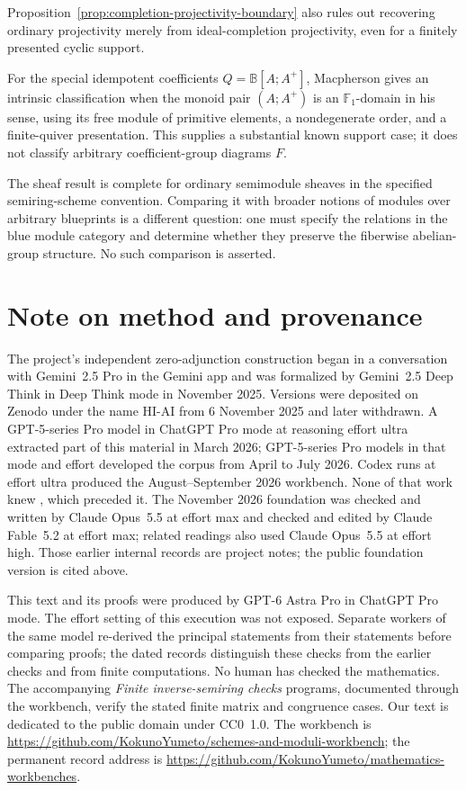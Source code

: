 \documentclass[11pt]{amsart}
\newcommand{\workbenchurl}{https://github.com/KokunoYumeto/schemes-and-moduli-workbench}
\newcommand{\recordurl}{https://github.com/KokunoYumeto/mathematics-workbenches}
\newcommand{\B}{\mathbb B}
\theoremstyle{definition}
\theoremstyle{remark}
\begin{document}
Proposition~\ref{prop:completion-projectivity-boundary} also rules out recovering ordinary projectivity merely from ideal-completion projectivity, even for a finitely presented cyclic support.

For the special idempotent coefficients $Q=\B[A;A^+]$, Macpherson \cite[Definition~4.9 and Corollary~4.13, pp.~14--16]{Macpherson} gives an intrinsic classification when the monoid pair $(A;A^+)$ is an $\mathbb F_1$-domain in his sense, using its free module of primitive elements, a nondegenerate order, and a finite-quiver presentation. This supplies a substantial known support case; it does not classify arbitrary coefficient-group diagrams $F$.

The sheaf result is complete for ordinary semimodule sheaves in the specified semiring-scheme convention. Comparing it with broader notions of modules over arbitrary blueprints is a different question: one must specify the relations in the blue module category and determine whether they preserve the fiberwise abelian-group structure. No such comparison is asserted.



\section*{Note on method and provenance}
The project's independent zero-adjunction construction began in a conversation with Gemini~2.5 Pro in the Gemini app and was formalized by Gemini~2.5 Deep Think in Deep Think mode in November 2025. Versions were deposited on Zenodo under the name HI-AI from 6 November 2025 and later withdrawn. A GPT-5-series Pro model in ChatGPT Pro mode at reasoning effort ultra extracted part of this material in March 2026; GPT-5-series Pro models in that mode and effort developed the corpus from April to July 2026. Codex runs at effort ultra produced the August--September 2026 workbench. None of that work knew \cite{FGJM}, which preceded it. The November 2026 foundation was checked and written by Claude Opus~5.5 at effort max and checked and edited by Claude Fable~5.2 at effort max; related readings also used Claude Opus~5.5 at effort high. Those earlier internal records are project notes; the public foundation version is cited above.

This text and its proofs were produced by GPT-6 Astra Pro in ChatGPT Pro mode. The effort setting of this execution was not exposed. Separate workers of the same model re-derived the principal statements from their statements before comparing proofs; the dated records distinguish these checks from the earlier checks and from finite computations. No human has checked the mathematics. The accompanying \emph{Finite inverse-semiring checks} programs, documented through the workbench, verify the stated finite matrix and congruence cases. Our text is dedicated to the public domain under CC0~1.0. The workbench is \expandafter\url\expandafter{\workbenchurl}; the permanent record address is \expandafter\url\expandafter{\recordurl}.
\end{document}
